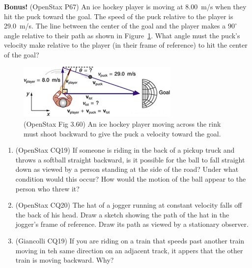 \documentclass[10pt,twocolumn]{exam}
\def\myquestion{\question\stepcounter{footnote}}
\begin{document}
\begin{questions}
\myquestion \textbf{Bonus!} (OpenStax P67)
An ice hockey player is moving at 8.00~m/s when they hit the puck toward the goal. The speed of the puck relative to the player is 29.0~m/s. The line between the center of the goal and the player makes a $90^\circ$ angle relative to their path as shown in Figure~\ref{3-60}. What angle must the puck's velocity make relative to the player (in their frame of reference) to hit the center of the goal?

  \begin{figure}[ht]
    \centering
    \includegraphics[width=3.1in]{3-60.jpg}
    \caption{(OpenStax Fig 3.60) An ice hockey player moving across the rink must shoot backward to give the puck a velocity toward the goal.}
    \label{3-60}
  \end{figure}



\begin{enumerate}[resume*]
  \item (OpenStax CQ19) If someone is riding in the back of a pickup truck and throws a softball straight backward, is it possible for the ball to fall straight down as viewed by a person standing at the side of the road? Under what condition would this occur? How would the motion of the ball appear to the person who threw it?
  \item (OpenStax CQ20) The hat of a jogger running at constant velocity falls off the back of his head. Draw a sketch showing the path of the hat in the jogger's frame of reference. Draw its path as viewed by a stationary observer.
  \item (Giancolli CQ19) If you are riding on a train that speeds past another train moving in teh same direction on an adjacent track, it appers that the other train is moving backward.  Why?

\end{enumerate}
  
\end{questions}
\end{document}
